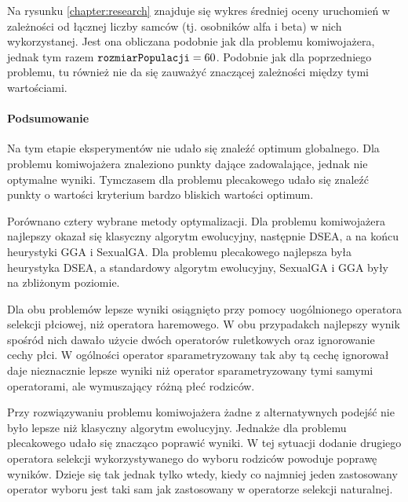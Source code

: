 \documentclass[./FM_mgr.tex]{subfiles}
\begin{document}
Na rysunku \ref{chapter:research} znajduje się wykres średniej oceny uruchomień w zależności od łącznej liczby samców (tj. osobników alfa i beta) w nich wykorzystanej.
Jest ona obliczana podobnie jak dla problemu komiwojażera, jednak tym razem $\mathtt{rozmiarPopulacji}=60$.
Podobnie jak dla poprzedniego problemu, tu również nie da się zauważyć znaczącej zależności między tymi wartościami.

\paragraph{Podsumowanie}

Na tym etapie eksperymentów nie udało się znaleźć optimum globalnego.
Dla problemu komiwojażera znaleziono punkty dające zadowalające, jednak nie optymalne wyniki.
Tymczasem dla problemu plecakowego udało się znaleźć punkty o wartości kryterium bardzo bliskich wartości optimum.

Porównano cztery wybrane metody optymalizacji.
Dla problemu komiwojażera najlepszy okazał się klasyczny algorytm ewolucyjny, następnie DSEA, a na końcu heurystyki GGA i SexualGA.
Dla problemu plecakowego najlepsza była heurystyka DSEA, a standardowy algorytm ewolucyjny, SexualGA i GGA były na zbliżonym poziomie.

Dla obu problemów lepsze wyniki osiągnięto przy pomocy uogólnionego operatora selekcji płciowej, niż operatora haremowego.
W obu przypadakch najlepszy wynik spośród nich dawało użycie dwóch operatorów ruletkowych oraz ignorowanie cechy płci.
W ogólności operator sparametryzowany tak aby tą cechę ignorował daje nieznacznie lepsze wyniki niż operator sparametryzowany tymi samymi operatorami, ale wymuszający różną płeć rodziców.

Przy rozwiązywaniu problemu komiwojażera żadne z alternatywnych podejść nie było lepsze niż klasyczny algorytm ewolucyjny.
Jednakże dla problemu plecakowego udało się znacząco poprawić wyniki.
W tej sytuacji dodanie drugiego operatora selekcji wykorzystywanego do wyboru rodziców powoduje poprawę wyników.
Dzieje się tak jednak tylko wtedy, kiedy co najmniej jeden zastosowany operator wyboru jest taki sam jak zastosowany w operatorze selekcji naturalnej.
\end{document}
